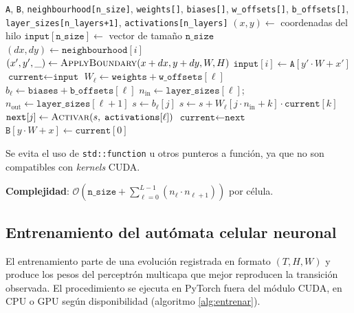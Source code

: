 \begin{breakablealgorithm}
\caption{ncaKernel: \textit{forward pass} del MLP por célula}
\label{alg:nca-fwd}
\begin{algorithmic}[1]
\Require \texttt{A}, \texttt{B}, \texttt{neighbourhood[n\_size]}, \texttt{weights[]}, \texttt{biases[]}, \texttt{w\_offsets[]}, \texttt{b\_offsets[]}, \texttt{layer\_sizes[n\_layers+1]}, \texttt{activations[n\_layers]}
\State $(x, y) \gets$ coordenadas del hilo
 \State \Return \EndIf
\State $\texttt{input}[\texttt{n\_size}] \gets$ vector de tamaño $\texttt{n\_size}$
    \State $(dx, dy) \gets \texttt{neighbourhood}[i]$
    \State $(x', y', \_) \gets \textsc{ApplyBoundary}(x + dx, y + dy, W, H)$
    \State $\texttt{input}[i] \gets \texttt{A}[y' \cdot W + x']$
\EndFor
\State $\texttt{current} \gets \texttt{input}$
    \State $W_\ell \gets \texttt{weights} + \texttt{w\_offsets}[\ell]$
    \State $b_\ell \gets \texttt{biases} + \texttt{b\_offsets}[\ell]$
    \State $n_{\text{in}} \gets \texttt{layer\_sizes}[\ell]$;\quad $n_{\text{out}} \gets \texttt{layer\_sizes}[\ell+1]$
        \State $s \gets b_\ell[j]$
            \State $s \gets s + W_\ell[j \cdot n_{\text{in}} + k] \cdot \texttt{current}[k]$
        \EndFor
        \State $\texttt{next}[j] \gets \textsc{Activar}(s,\; \texttt{activations}[\ell])$
    \EndFor
    \State $\texttt{current} \gets \texttt{next}$
\EndFor
\State $\texttt{B}[y \cdot W + x] \gets \texttt{current}[0]$
\end{algorithmic}
\end{breakablealgorithm}
Se evita el uso de \texttt{std::function} u otros punteros a función, ya que no son compatibles con \textit{kernels} CUDA.

\textbf{Complejidad}: $\displaystyle \mathcal{O}\left(\texttt{n\_size} + \sum_{\ell = 0}^{L - 1}(n_\ell \cdot n_{\ell+1})\right)$ por célula. 

\subsection{Entrenamiento del autómata celular neuronal}

El entrenamiento parte de una evolución registrada en formato $(T, H, W)$ y produce los pesos del perceptrón multicapa que mejor reproducen la transición observada. El procedimiento se ejecuta en PyTorch fuera del módulo CUDA, en CPU o GPU según disponibilidad (algoritmo \ref{alg:entrenar}).

